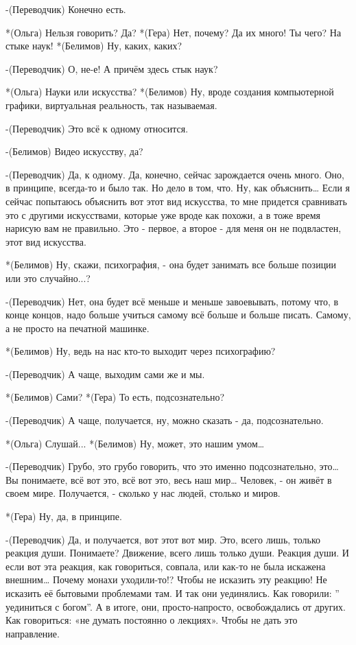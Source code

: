 -(Переводчик) Конечно есть.

*(Ольга) Нельзя говорить? Да?
*(Гера) Нет, почему? Да их много! Ты чего? На стыке наук!
*(Белимов) Ну, каких, каких?

-(Переводчик) О, не-е! А причём здесь стык наук?

*(Ольга) Науки или искусства?
*(Белимов) Ну, вроде создания компьютерной графики, виртуальная реальность, так называемая.

-(Переводчик) Это всё к одному относится.

-(Белимов) Видео искусству, да?

-(Переводчик) Да, к одному. Да, конечно, сейчас зарождается очень много. Оно, в принципе, всегда-то  и было так. Но дело в том, что. Ну, как объяснить… Если я сейчас попытаюсь объяснить вот этот вид искусства, то мне придется сравнивать это с другими искусствами, которые уже вроде как похожи, а в тоже время нарисую вам не правильно. Это - первое, а второе - для меня он не подвластен, этот вид искусства. 

*(Белимов) Ну, скажи, психография, - она будет занимать все больше позиции или это случайно...?

-(Переводчик) Нет, она будет всё меньше и меньше завоевывать, потому что, в конце концов, надо больше учиться самому всё больше и больше писать. Самому, а не просто на печатной машинке.

*(Белимов) Ну, ведь на нас кто-то выходит через психографию? 

-(Переводчик) А чаще, выходим сами же и мы.

*(Белимов) Сами?
*(Гера) То есть, подсознательно?

-(Переводчик) А чаще, получается, ну, можно сказать - да, подсознательно.

*(Ольга) Слушай...
*(Белимов) Ну, может,  это нашим умом…

-(Переводчик) Грубо, это грубо говорить, что это именно подсознательно, это… Вы понимаете,  всё вот это, всё вот это, весь наш мир… Человек, - он живёт в своем мире. Получается, - сколько у нас людей, столько и миров. 

*(Гера) Ну, да, в принципе.

-(Переводчик) Да, и получается, вот этот вот мир. Это, всего лишь, только реакция души. Понимаете? Движение, всего лишь только души. Реакция души. И если вот эта реакция, как говориться, совпала, или как-то не была искажена внешним… Почему монахи уходили-то!? Чтобы не исказить эту реакцию! Не исказить её бытовыми проблемами там. И так они уединялись. Как говорили: ” уединиться с богом”.  А в итоге, они, просто-напросто, освобождались от других. Как говориться: «не думать постоянно о лекциях». Чтобы не дать это направление. 


